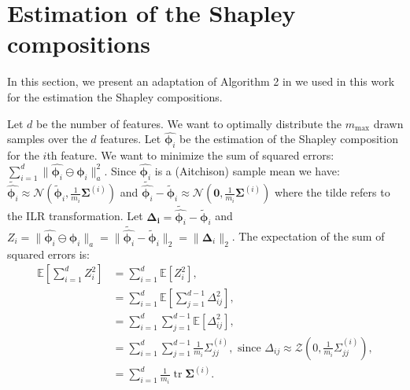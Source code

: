 \documentclass{article}
\theoremstyle{plain}
\theoremstyle{definition}
\theoremstyle{remark}
\DeclareMathOperator{\tr}{tr}
\begin{document}
\newpage
\section{Estimation of the Shapley compositions}
\label{app:algo}
In this section, we present an adaptation of Algorithm 2 in \cite{vstrumbelj2014explaining} we used in this work for the estimation the Shapley compositions.

Let $d$ be the number of features. We want to optimally distribute the $m_{\text{max}}$ drawn samples over the $d$ features. Let $\hat{\bm{\phi}_i}$ be the estimation of the Shapley composition for the $i$th feature. We want to minimize the sum of squared errors: $\displaystyle\sum_{i=1}^{d} \| \hat{\bm{\phi}_i} \ominus \bm{\phi}_i \|_a^2$. Since $\hat{\bm{\phi}_i}$ is a (Aitchison) sample mean we have: $\tilde{\hat{\bm{\phi}_i}} \approx \mathcal{N}(\tilde{\bm{\phi}}_i, \frac{1}{m_i}\bm{\Sigma}^{(i)})$ and $\tilde{\hat{\bm{\phi}_i}} - \tilde{\bm{\phi}}_i \approx \mathcal{N}(\bm{0}, \frac{1}{m_i}\bm{\Sigma}^{(i)})$ where the tilde refers to the ILR transformation.
Let $\bm{\Delta_i} = \tilde{\hat{\bm{\phi}_i}} - \tilde{\bm{\phi}}_i$ and $Z_i = \| \hat{\bm{\phi}_i} \ominus \bm{\phi}_i \|_a = \| \tilde{\hat{\bm{\phi}_i}} - \tilde{\bm{\phi}}_i \|_2 = \| \bm{\Delta}_i \|_2$. The expectation of the sum of squared errors is:
\begin{equation}
  \begin{aligned}
    \mathbb{E}\left[ \sum_{i=1}^{d} Z_i^2 \right] &=   \sum_{i=1}^{d} \mathbb{E}\left[ Z_i^2 \right],\\
                                                  & =\sum_{i=1}^{d} \mathbb{E}\left[ \sum_{j=1}^{d-1}\Delta_{ij}^2 \right],\\
                                                  & =\sum_{i=1}^{d} \sum_{j=1}^{d-1} \mathbb{E}\left[\Delta_{ij}^2 \right],\\
                                                  & =\sum_{i=1}^{d} \sum_{j=1}^{d-1} \frac{1}{m_i}\Sigma_{jj}^{(i)}, \text{ since } \Delta_{ij}\approx \mathcal{Z}(0, \frac{1}{m_i}\Sigma_{jj}^{(i)}),\\
    &= \sum_{i=1}^d \frac{1}{m_i} \tr \bm{\Sigma}^{(i)}.
  \end{aligned}
\end{equation}
\end{document}
